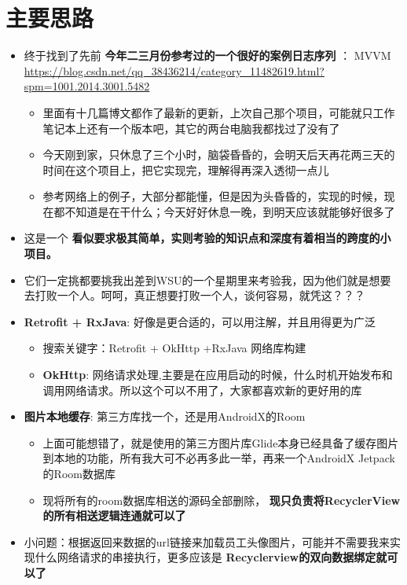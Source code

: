 \documentclass[9pt, b5paper]{article}
\begin{document}
\section{主要思路}
\label{sec-2}
\begin{itemize}
\item 终于找到了先前 \textbf{今年二三月份参考过的一个很好的案例日志序列} ： MVVM \url{https://blog.csdn.net/qq_38436214/category_11482619.html?spm=1001.2014.3001.5482}
\begin{itemize}
\item 里面有十几篇博文都作了最新的更新，上次自己那个项目，可能就只工作笔记本上还有一个版本吧，其它的两台电脑我都找过了没有了
\item 今天刚到家，只休息了三个小时，脑袋昏昏的，会明天后天再花两三天的时间在这个项目上，把它实现完，理解得再深入透彻一点儿
\item 参考网络上的例子，大部分都能懂，但是因为头昏昏的，实现的时候，现在都不知道是在干什么；今天好好休息一晚，到明天应该就能够好很多了
\end{itemize}
\item 这是一个 \textbf{看似要求极其简单，实则考验的知识点和深度有着相当的跨度的小项目。}
\item 它们一定挑都要挑我出差到WSU的一个星期里来考验我，因为他们就是想要去打败一个人。呵呵，真正想要打败一个人，谈何容易，就凭这？？？
\item \textbf{Retrofit + RxJava}: 好像是更合适的，可以用注解，并且用得更为广泛
\begin{itemize}
\item 搜索关键字：Retrofit + OkHttp +RxJava 网络库构建
\item \textbf{OkHttp}: 网络请求处理,主要是在应用启动的时候，什么时机开始发布和调用网络请求。所以这个可以不用了，大家都喜欢新的更好用的库
\end{itemize}
\item \textbf{图片本地缓存}: 第三方库找一个，还是用AndroidX的Room
\begin{itemize}
\item 上面可能想错了，就是使用的第三方图片库Glide本身已经具备了缓存图片到本地的功能，所有我大可不必再多此一举，再来一个AndroidX Jetpack的Room数据库
\item 现将所有的room数据库相送的源码全部删除， \textbf{现只负责将RecyclerView的所有相送逻辑连通就可以了}
\end{itemize}
\item 小问题：根据返回来数据的url链接来加载员工头像图片，可能并不需要我来实现什么网络请求的串接执行，更多应该是 \textbf{Recyclerview的双向数据绑定就可以了}

\end{itemize}
\end{document}
